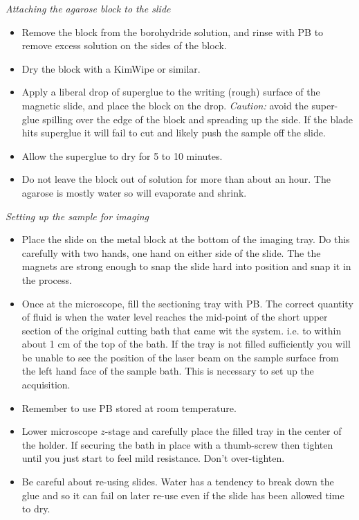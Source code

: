 \documentclass[paper=a4, fontsize=11pt]{scrartcl} %
\numberwithin{equation}{section} %
\numberwithin{figure}{section} %
\numberwithin{table}{section} %
\begin{document}
\textit{Attaching the agarose block to the slide}
\begin{itemize}
\item Remove the block from the borohydride solution, and rinse with PB to remove excess solution on the
sides of the block.
\item Dry the block with a KimWipe or similar. 
\item Apply a liberal drop of superglue to the writing (rough) surface of the magnetic slide, 
and place the block on the drop. 
\textit{Caution:} avoid the super-glue spilling over the edge of the block and spreading up the side. 
If the blade hits superglue it will fail to cut and likely push the sample off the slide. 
\item Allow the superglue to dry for 5 to 10 minutes. 
\item Do not leave the block out of solution for more than about an hour.
The agarose is mostly water so will evaporate and shrink.
\end{itemize}


\textit{Setting up the sample for imaging}
\begin{itemize}
\item Place the slide on the metal block at the bottom of the imaging tray. 
Do this carefully with two hands, one hand on either side of the slide.
The the magnets are strong enough to snap the slide hard into position and snap it in the process. 
\item Once at the microscope, fill the sectioning tray with PB. 
The correct quantity of fluid is when the water level reaches the mid-point of the short upper section of the original cutting bath that came wit the system. 
i.e. to within about 1 cm of the top of the bath.
If the tray is not filled sufficiently you will be unable to see the position of the laser beam on the sample surface from the left hand face of the sample bath.
This is necessary to set up the acquisition.
\item Remember to use PB stored at room temperature.
\item Lower microscope $z$-stage and carefully place the filled tray in the center of the holder. 
If securing the bath in place with a thumb-screw then tighten until you just start to feel mild resistance. 
Don't over-tighten. 
\item Be careful about re-using slides.
Water has a tendency to break down the glue and so it can fail on later re-use even if the slide has been allowed time to dry. 
\end{itemize}
\end{document}
